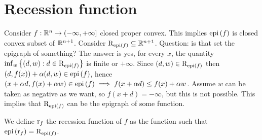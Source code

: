 \section{Recession function}

Consider $f : {\mathbb{R}^n} \to (-\infty,+\infty]$ closed proper convex. This implies $\mathrm{epi}\left(f\right)$ is closed convex subset of ${\mathbb{R}^{n+1}}$. Consider $\mathrm{R}_{\mathrm{epi}\left(f\right)} \subseteq {\mathbb{R}^{n+1}}$. Question: is that set the epigraph of something? The answer is yes, for every $x$, the quantity $\inf_w \left\{ (d,w) : d \in \mathrm{R}_{\mathrm{epi}\left(f\right)} \right\}$ is finite or $+\infty$. Since $(d,w) \in \mathrm{R}_{\mathrm{epi}\left(f\right)}$ then $(d,f(x)) + \alpha (d,w) \in \mathrm{epi}\left(f\right)$, hence $(x + \alpha d, f(x) + \alpha w) \in \mathrm{epi}\left(f\right) \implies f(x+\alpha d) \le f(x) + \alpha w$. Assume $w$ can be taken as negative as we want, so $f(x + d) = -\infty$, but this is not possible. This implies that $\mathrm{R}_{\mathrm{epi}\left(f\right)}$ can be the epigraph of some function.

\begin{definition}

    We define $\mathrm{r}_{f}$ the recession function of $f$ as the function such that $\mathrm{epi}\left(\mathrm{r}_{f}\right) = \mathrm{R}_{\mathrm{epi}\left(f\right)}$.

\end{definition}

